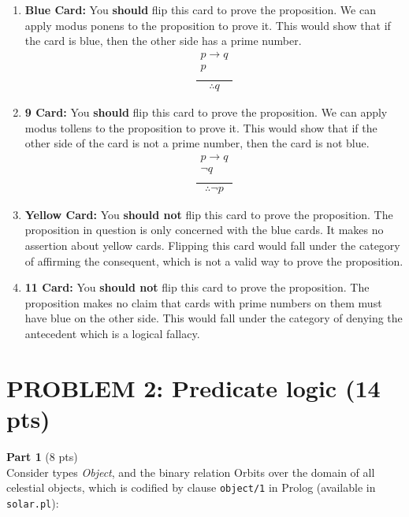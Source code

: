 \documentclass[12pt]{article}
\begin{document}
\begin{enumerate}
	\item \textbf{Blue Card:} You \textbf{should} flip this card to prove the proposition. We can apply modus ponens to the proposition to prove it. This would show that if the card is blue, then the other side has a prime number. 
	\[
	\frac{
	\begin{array}{c}
		p \rightarrow q \\
		p \\
	\end{array}
	}{
	\begin{array}{c}
		\therefore q
	\end{array}
	}
	\]
	\item \textbf{9 Card:} You \textbf{should} flip this card to prove the proposition. We can apply modus tollens to the proposition to prove it. This would show that if the other side of the card is not a prime number, then the card is not blue.
	\[
		\frac{
		\begin{array}{c}
			p \rightarrow q \\
			\neg q \\
		\end{array}
		}{
		\begin{array}{c}
			\therefore \neg p
		\end{array}
		}
		\]
	\item \textbf{Yellow Card:} You \textbf{should not} flip this card to prove the proposition. The proposition in question is only concerned with the blue cards. It makes no assertion about yellow cards. Flipping this card would fall under the category of affirming the consequent, which is not a valid way to prove the proposition.
	\item \textbf{11 Card:} You \textbf{should not} flip this card to prove the proposition. The proposition makes no claim that cards with prime numbers on them must have blue on the other side. This would fall under the category of denying the antecedent which is a logical fallacy.
\end{enumerate}

\pagebreak

\section*{PROBLEM 2: Predicate logic (14 pts)}
												
	\textbf{Part 1} (8 pts)\\
	Consider types \textit{Object}, and the binary relation Orbits over the domain of all celestial objects,
	which is codified by clause \texttt{object/1} in Prolog (available in \texttt{solar.pl}):
\end{document}
